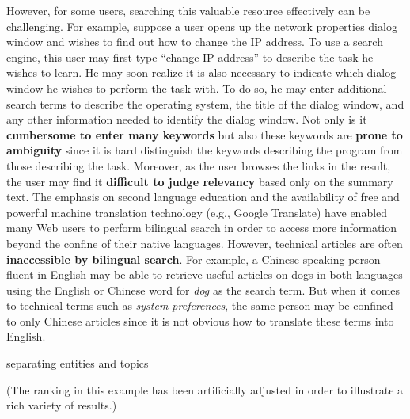 \documentclass{www2010-submission}
\begin{document}
However, for some users, searching this valuable resource
effectively can be challenging. For example, suppose a user opens
up the network properties dialog window and wishes to find out how
to change the IP address. To use a search engine, this user may
first type ``change IP address'' to describe the task he wishes to
learn. He may soon realize it is also necessary to indicate which
dialog window he wishes to perform the task with. To do so, he may
enter additional search terms to describe the operating system,
the title of the dialog window, and any other information needed
to identify the dialog window. Not only is it \textbf{cumbersome
to enter many keywords} but also these keywords are \textbf{prone
to ambiguity} since it is hard distinguish the keywords describing
the program from those describing the task. Moreover, as the user
browses the links in the result, the user may find it
\textbf{difficult to judge relevancy} based only on the summary
text. The emphasis on second language education and the
availability of free and powerful machine translation technology
(e.g., Google Translate) have enabled many Web users to perform
bilingual search in order to access more information beyond the
confine of their native languages. However, technical articles are
often \textbf{inaccessible by bilingual search}. For example, a
Chinese-speaking person fluent in English may be able to retrieve
useful articles on dogs in both languages using the English or
Chinese word for \emph{dog} as the search term. But when it comes
to technical terms such as \emph{system preferences}, the same
person may be confined to only Chinese articles since it is not
obvious how to translate these terms into English.

separating entities and topics



(The ranking in this example has been artificially adjusted in
order to illustrate a rich variety of results.)
\end{document}
